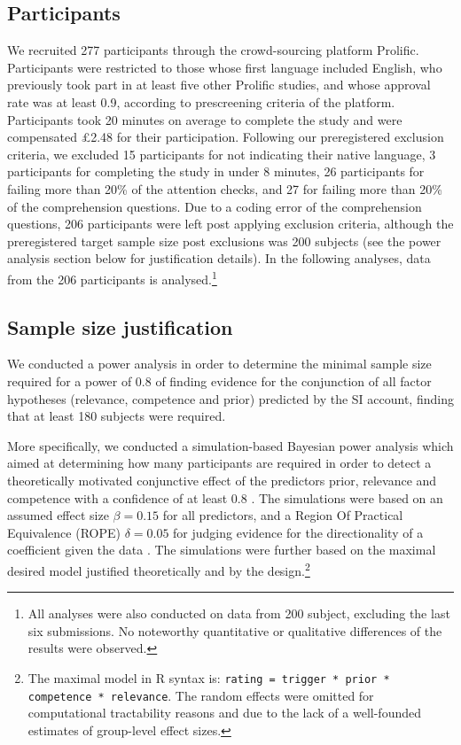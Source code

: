 \documentclass{sp}
\newcommand{\mf}[1]{\textcolor{BurntOrange}{[MF: #1]}}
\begin{document}
\subsection{Participants}
We recruited 277 participants through the crowd-sourcing platform Prolific. Participants were restricted to those whose first language included English, who previously took part in at least five other Prolific studies, and whose approval rate was at least 0.9, according to prescreening criteria of the platform. Participants took 20 minutes on average to complete the study and were compensated \pounds2.48 for their participation. Following our preregistered exclusion criteria, we excluded 15 participants for not indicating their native language, 3 participants for completing the study in under 8 minutes, 26 participants for failing more than 20\% of the attention checks, and 27 for failing more than 20\% of the comprehension questions. Due to a coding error of the comprehension questions, 206 participants were left post applying exclusion criteria, although the preregistered target sample size post exclusions was 200 subjects (see the power analysis section below for justification details).
In the following analyses, data from the 206 participants is analysed.\footnote{All analyses were also conducted on data from 200 subject, excluding the last six submissions. No noteworthy quantitative or qualitative differences of the results were observed.}

\subsection{Sample size justification}
We conducted a power analysis in order to determine the minimal sample size required for a power of 0.8 of finding evidence for the conjunction of all factor hypotheses (relevance, competence and prior) predicted by the SI account, finding that at least 180 subjects were required. 

More specifically, we conducted a simulation-based Bayesian power analysis which aimed at determining how many participants are required in order to detect a theoretically motivated conjunctive effect of the predictors prior, relevance and competence with a confidence of at least 0.8 \citep[e.g.,][]{degen2015investigating}. The simulations were based on an assumed effect size $\beta = 0.15$ for all predictors, and a Region Of Practical Equivalence (ROPE) $\delta = 0.05$ for judging evidence for the directionality of a coefficient given the data \citep{kruschke2014doing}. The simulations were further based on the maximal desired model justified theoretically and by the design.\footnote{The maximal model in R syntax is: \texttt{rating = trigger * prior * competence * relevance}. The random effects were omitted for computational tractability reasons and due to the lack of a well-founded estimates of group-level effect sizes.}
\end{document}

